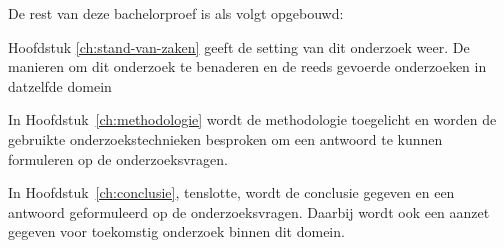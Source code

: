 De rest van deze bachelorproef is als volgt opgebouwd:

Hoofdstuk \ref{ch:stand-van-zaken} geeft de setting van dit onderzoek weer. De manieren om dit onderzoek te benaderen en de reeds gevoerde onderzoeken in datzelfde domein

In Hoofdstuk~\ref{ch:methodologie} wordt de methodologie toegelicht en worden de gebruikte onderzoekstechnieken besproken om een antwoord te kunnen formuleren op de onderzoeksvragen.


In Hoofdstuk~\ref{ch:conclusie}, tenslotte, wordt de conclusie gegeven en een antwoord geformuleerd op de onderzoeksvragen. Daarbij wordt ook een aanzet gegeven voor toekomstig onderzoek binnen dit domein.